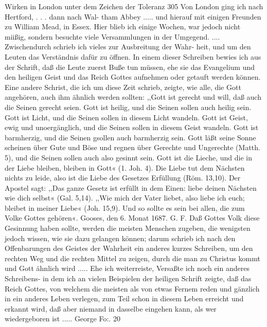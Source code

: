 Wirken in London unter dem Zeichen der Toleranz 305
Von London ging ich nach Hertford, . . . dann nach Wal-
tham Abbey ..... und hierauf mit einigen Freunden zu William
Mead, in Essex. Hier blieb ich einige Wochen, war jedoch nicht
miißig, sondern besuchte viele Versammlungen in der Umgegend.
.... Zwischendurch schrieb ich vieles zur Ausbreitung der Wahr-
heit, und um den Leuten das Verständnis dafür zu öffnen. In
einem dieser Schreiben bewies ich aus der Schrift, daß die Leute
zuerst Buße tun müssen, ehe sie das Evangelium und den heiligen
Geist und das Reich Gottes aufnehmen oder getauft werden können.
Eine andere Schrist, die ich um diese Zeit schrieb, zeigte, wie
alle, die Gott angehören, auch ihm ähnlich werden sollten:
,,Gott ist gerecht und will, daß auch die Seinen gerecht seien.
Gott ist heilig, und die Seinen sollen auch heilig sein. Gott ist
Licht, und die Seinen sollen in diesem Licht wandeln. Gott ist
Geist, ewig und unoergänglich, und die Seinen sollen in diesem
Geist wandeln. Gott ist barmherzig, und die Seinen gsollen auch
barmherzig sein. Gott läßt seine Sonne scheinen über Gute und
Böse und regnen über Gerechte und Ungerechte (Matth. 5), und
die Seinen sollen auch also gesinnt sein. Gott ist die Lieche, und
die in der Liebe bleiben, bleiben in Gott« (1. Joh. 4). Die Liebe
tut dem Nächsten nichts zu leide, also ist die Liebe des Gesetzes
Erfüllung (Röm. 13,10). Der Apostel sagt: ,,Das ganze Gesetz
ist erfüllt in dem Einen: liebe deinen Nächsten wie dich selbst«
(Gal. 5,14). ,,Wie mich der Vater liebet, also liebe ich euch;
bleibet in meiner Liebe« (Joh. 15,9). Und so sollte es sein bei
allen, die zum Volke Gottes gehören«.
Gooses, den 6. Monat 1687. G. F.
Daß Gottes Volk diese Gesinnung haben sollte, werden die
meisten Menschen zugeben, die wenigsten jedoch wissen, wie sie
dazu gelangen können; darum schrieb ich nach den Offenbarungen
des Geistes der Wahrheit ein anderes kurzes Schreiben, um den
rechten Weg und die rechten Mittel zu zeigen, durch die man zu
Christus kommt und Gott ähnlich wird .....
Ehe ich weiterreiste, Versaßte ich noch ein anderes Schreibens-
in dem ich an vielen Beispielen der heiligen Schrift zeigte, daß
das Reich Gottes, von welchem die meisten als von etwas Fernem
reden und gänzlich in ein anderes Leben verlegen, zum Teil schon
in diesem Leben erreicht und erkannt wird, daß aber niemand
in dasselbe eingehen kann, als wer wiedergeboren ist .....  
George Fo:. 20


